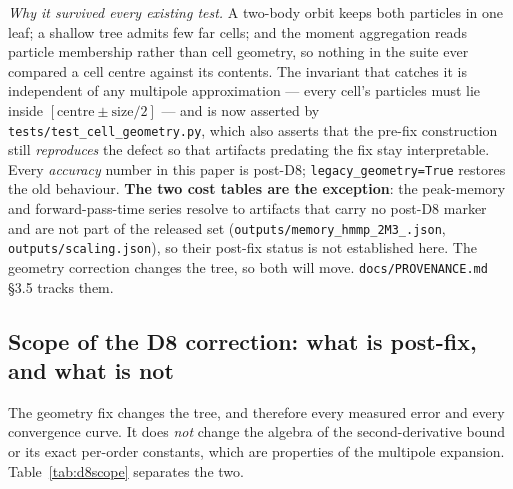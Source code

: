 \emph{Why it survived every existing test.} A two-body orbit keeps both particles in one leaf; a
shallow tree admits few far cells; and the moment aggregation reads particle membership rather than
cell geometry, so nothing in the suite ever compared a cell centre against its contents. The
invariant that catches it is independent of any multipole approximation --- every cell's particles
must lie inside $[\text{centre}\pm\text{size}/2]$ --- and is now asserted by
\texttt{tests/\allowbreak test\_\allowbreak cell\_\allowbreak geometry.\allowbreak py}, which also asserts that the pre-fix construction still
\emph{reproduces} the defect so that artifacts predating the fix stay interpretable. Every
\emph{accuracy} number in this paper is post-D8; \texttt{legacy\_geometry=True} restores the old
behaviour. \textbf{The two cost tables are the exception}: the peak-memory and forward-pass-time
series resolve to artifacts that carry no post-D8 marker and are not part of the released set
(\texttt{outputs/\allowbreak memory\_\allowbreak hmmp\_\allowbreak 2M3\_\allowbreak *.\allowbreak json}, \texttt{outputs/\allowbreak scaling.\allowbreak json}), so their post-fix
status is not established here. The geometry correction changes the tree, so both will move.
\texttt{docs/\allowbreak PROVENANCE.\allowbreak md} \S3.5 tracks them.

\subsection{Scope of the D8 correction: what is post-fix, and what is not}
\label{app:d8scope}

The geometry fix changes the tree, and therefore every measured error and every convergence curve.
It does \emph{not} change the algebra of the second-derivative bound or its exact per-order
constants, which are properties of the multipole expansion. Table~\ref{tab:d8scope} separates the two.

